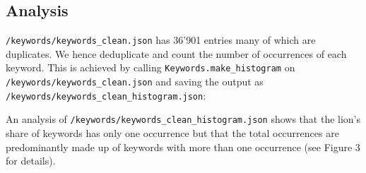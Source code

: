 \hypertarget{analysis-1}{%
\subsection{Analysis}\label{analysis-1}}

\texttt{/keywords/keywords\_clean.json} has 36'901 entries many of which
are duplicates. We hence deduplicate and count the number of occurrences
of each keyword. This is achieved by calling
\texttt{Keywords.make\_histogram} on
\texttt{/keywords/keywords\_clean.json} and saving the output as
\texttt{/keywords/keywords\_clean\_histogram.json}:

\begin{Shaded}
\begin{Highlighting}[]
\OperatorTok{=}\OperatorTok{+} \NormalTok{)}
\OperatorTok{=}
\OperatorTok{+} \NormalTok{)}
\end{Highlighting}
\end{Shaded}

An analysis of \texttt{/keywords/keywords\_clean\_histogram.json} shows
that the lion's share of keywords has only one occurrence but that the
total occurrences are predominantly made up of keywords with more than
one occurrence (see Figure 3 for details).

